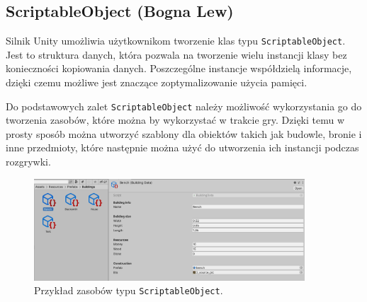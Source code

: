 \subsection{ScriptableObject (Bogna Lew)}\label{ss:so}
Silnik Unity umożliwia użytkownikom tworzenie klas typu \texttt{ScriptableObject}. Jest to struktura danych, która pozwala na
tworzenie wielu instancji klasy bez konieczności kopiowania danych. Poszczególne instancje współdzielą informacje, dzięki
czemu możliwe jest znaczące zoptymalizowanie użycia pamięci.

Do podstawowych zalet \texttt{ScriptableObject} należy możliwość wykorzystania go do tworzenia zasobów, które można by wykorzystać
w trakcie gry. Dzięki temu w prosty sposób można utworzyć szablony dla obiektów takich jak budowle, bronie i inne
przedmioty, które następnie można użyć do utworzenia ich instancji podczas rozgrywki.

\begin{figure}[h!]
    \centering
    \includegraphics[width=0.9\textwidth]{images/scriptableobjects.jpg}
    \caption{Przykład zasobów typu \texttt{ScriptableObject}.}
\end{figure}
\FloatBarrier
